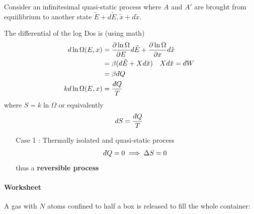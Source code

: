 \documentclass[../main.tex]{subfiles}
\begin{document}
Consider an infinitesimal quasi-static process where $A$ and $A'$ are brought from equiilibrium to another state $\tilde E + d\tilde E, \tilde x + d\tilde x$.

The differential of the log Dos is (using math)
\begin{align*}
    d\ln\Omega(E,x) &= \pdv{\ln\Omega}{E} d\tilde E + \pdv{\ln\Omega}{x} d\tilde x \\
    &= \beta(d\tilde E + X d\tilde x) \quad Xd\tilde x = d\hspace*{-0.08em}\bar{}\hspace*{0.1em} W \\
    &= \beta d\hspace*{-0.08em}\bar{}\hspace*{0.1em} Q \\
    k d\ln\Omega(E,x) &= \frac{d\hspace*{-0.08em}\bar{}\hspace*{0.1em} Q}{T} 
\end{align*}
where $S = k \ln \Omega$ or equivalently 
\begin{align*}
    dS = \frac{d\hspace*{-0.08em}\bar{}\hspace*{0.1em} Q}{T}
\end{align*}

\begin{itemize}
    \item [Case 1]: Thermally isolated and quasi-static process
    \begin{align*}
        d\hspace*{-0.08em}\bar{}\hspace*{0.1em} Q = 0 \implies \Delta S = 0
    \end{align*}
    thus a \textbf{reversible process}
\end{itemize}

\paragraph{Worksheet} 

A gas with $N$ atoms confined to half a box is released to fill the whole container:
\end{document}
